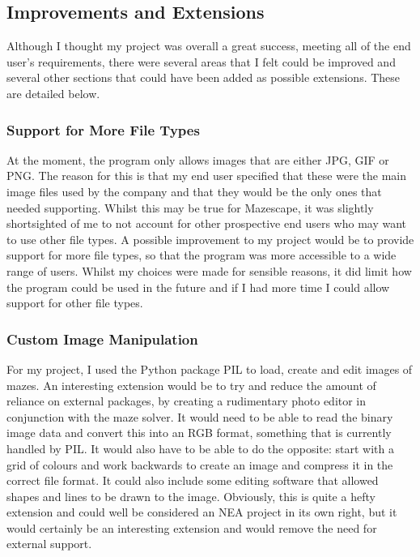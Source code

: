 \documentclass[titlepage]{article}
\begin{document}
\subsection{Improvements and Extensions}
Although I thought my project was overall a great success, meeting all of the end user's requirements, there were several areas that I felt could be improved and several other sections that could have been added as possible extensions. These are detailed below.

\subsubsection{Support for More File Types}
At the moment, the program only allows images that are either JPG, GIF or PNG. The reason for this is that my end user specified that these were the main image files used by the company and that they would be the only ones that needed supporting. Whilst this may be true for Mazescape, it was slightly shortsighted of me to not account for other prospective end users who may want to use other file types. A possible improvement to my project would be to provide support for more file types, so that the program was more accessible to a wide range of users. Whilst my choices were made for sensible reasons, it did limit how the program could be used in the future and if I had more time I could allow support for other file types.

\subsubsection{Custom Image Manipulation}
For my project, I used the Python package PIL to load, create and edit images of mazes. An interesting extension would be to try and reduce the amount of reliance on external packages, by creating a rudimentary photo editor in conjunction with the maze solver. It would need to be able to read the binary image data and convert this into an RGB format, something that is currently handled by PIL. It would also have to be able to do the opposite: start with a grid of colours and work backwards to create an image and compress it in the correct file format. It could also include some editing software that allowed shapes and lines to be drawn to the image. Obviously, this is quite a hefty extension and could well be considered an NEA project in its own right, but it would certainly be an interesting extension and would remove the need for external support.
\end{document}
